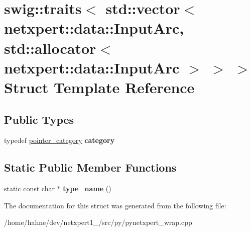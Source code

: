 \hypertarget{structswig_1_1traits_3_01std_1_1vector_3_01netxpert_1_1data_1_1InputArc_00_01std_1_1allocator_3_c60b8b5b75d27ef8a73bcb6fd9996d98}{}\section{swig\+:\+:traits$<$ std\+:\+:vector$<$ netxpert\+:\+:data\+:\+:Input\+Arc, std\+:\+:allocator$<$ netxpert\+:\+:data\+:\+:Input\+Arc $>$ $>$ $>$ Struct Template Reference}
\label{structswig_1_1traits_3_01std_1_1vector_3_01netxpert_1_1data_1_1InputArc_00_01std_1_1allocator_3_c60b8b5b75d27ef8a73bcb6fd9996d98}
\subsection*{Public Types}
\begin{DoxyCompactItemize}
\item 
typedef \hyperlink{structswig_1_1pointer__category}{pointer\+\_\+category} {\bfseries category}\hypertarget{structswig_1_1traits_3_01std_1_1vector_3_01netxpert_1_1data_1_1InputArc_00_01std_1_1allocator_3_c60b8b5b75d27ef8a73bcb6fd9996d98_a93edbbc3afc56b90b77fae3c7fa2d7c3}{}\label{structswig_1_1traits_3_01std_1_1vector_3_01netxpert_1_1data_1_1InputArc_00_01std_1_1allocator_3_c60b8b5b75d27ef8a73bcb6fd9996d98_a93edbbc3afc56b90b77fae3c7fa2d7c3}

\end{DoxyCompactItemize}
\subsection*{Static Public Member Functions}
\begin{DoxyCompactItemize}
\item 
static const char $\ast$ {\bfseries type\+\_\+name} ()\hypertarget{structswig_1_1traits_3_01std_1_1vector_3_01netxpert_1_1data_1_1InputArc_00_01std_1_1allocator_3_c60b8b5b75d27ef8a73bcb6fd9996d98_a79972fcc89aa54a85d87818c64a47f61}{}\label{structswig_1_1traits_3_01std_1_1vector_3_01netxpert_1_1data_1_1InputArc_00_01std_1_1allocator_3_c60b8b5b75d27ef8a73bcb6fd9996d98_a79972fcc89aa54a85d87818c64a47f61}

\end{DoxyCompactItemize}


The documentation for this struct was generated from the following file\+:\begin{DoxyCompactItemize}
\item 
/home/hahne/dev/netxpert1\+\_/src/py/pynetxpert\+\_\+wrap.\+cpp\end{DoxyCompactItemize}
